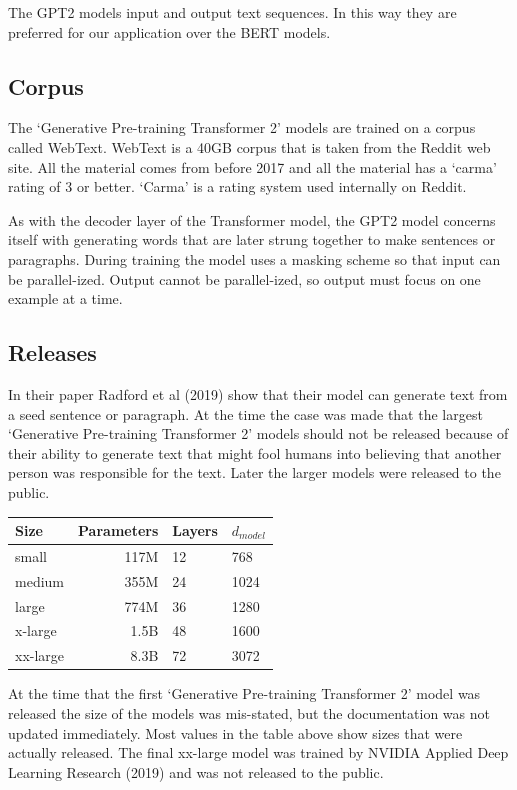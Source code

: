 The GPT2 models input and output text sequences. In this way they are preferred for our application over the BERT models. 

\subsection*{Corpus}
The `Generative Pre-training Transformer 2' models are trained on a corpus called WebText. WebText is a 40GB corpus that is taken from the Reddit web site. All the material comes from before 2017 and all the material has a `carma' rating of 3 or better. `Carma' is a rating system used internally on Reddit. 

As with the decoder layer of the Transformer model, the GPT2 model concerns itself with generating words that are later strung together to make sentences or paragraphs. During training the model uses a masking scheme so that input can be parallel-ized. Output cannot be parallel-ized, so output must focus on one example at a time.

\subsection*{Releases}
In their paper Radford et al (2019)\cite{radford2019language} show that their model can generate text from a seed sentence or paragraph. At the time the case was made that the largest `Generative Pre-training Transformer 2' models should not be released because of their ability to generate text that might fool humans into believing that another person was responsible for the text. Later the larger models were released to the public.

\begin{center}

\begin{tabular}{lrll}
	Size & Parameters & Layers & $d_{model}$ \\
	\hline
	small & 117M       & 12     & 768          \\
	medium & 355M       & 24     & 1024         \\
	large & 774M       & 36     & 1280         \\
	x-large & 1.5B     & 48     & 1600 \\
	xx-large & 8.3B   &  72 &   3072 
\end{tabular}

	
\end{center}

At the time that the first `Generative Pre-training Transformer 2' model was released the size of the models was mis-stated, but the documentation was not updated immediately. Most values in the table above show sizes that were actually released. The final xx-large model was trained by NVIDIA Applied Deep Learning Research (2019)\cite{2019NVIDIAadlr} and was not released to the public.

